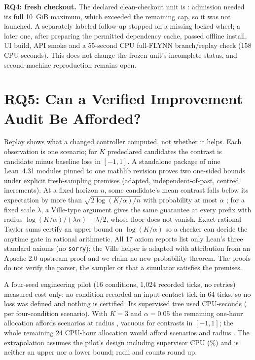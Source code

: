 \documentclass[letterpaper]{article}
\newcommand{\studyinput}[1]{}
\begin{document}
\begin{table}[t]
\centering\small
\caption{Operation costs on retained RQ2 source runs; each measures different work.}
\label{tab:operation}\resizebox{\columnwidth}{!}{\studyinput{operation-table}}
\end{table}

\textbf{RQ4: fresh checkout.} The declared clean-checkout unit is \OfflineStatus{}: admission needed its full 10~GiB
maximum, which exceeded the remaining cap, so it was not launched. A separately labeled follow-up stopped on a missing
locked wheel; a later one, after preparing the permitted dependency cache, passed offline install, UI build, API smoke
and a 55-second CPU full-FLYNN branch/replay check (158 CPU-seconds). This does not change the frozen unit's incomplete
status, and second-machine reproduction remains open.

\section{RQ5: Can a Verified Improvement Audit Be Afforded?}
Replay shows what a changed controller computed, not whether it helps. Each observation is one scenario; for $K$
predeclared candidates the contrast is candidate minus baseline loss in $[-1,1]$. A standalone package of nine Lean~4.31
modules pinned to one mathlib revision \citep{demoura2021lean4,mathlib2020} proves two one-sided bounds under explicit
fresh-sampling premises (adapted, independent-of-past, centred increments). At a fixed horizon $n$, some candidate's mean
contrast falls below its expectation by more than $\sqrt{2\log(K/\alpha)/n}$ with probability at most $\alpha$
\citep{hoeffding1963probability}; for a fixed scale $\lambda$, a Ville-type argument
\citep{ville1939etude,howard2021timeuniform} gives the same guarantee at every prefix with radius
$\log(K/\alpha)/(\lambda n)+\lambda/2$, whose floor does not vanish. Exact rational Taylor sums certify an upper bound on
$\log(K/\alpha)$ so a checker can decide the anytime gate in rational arithmetic. All 17 axiom reports list only Lean's
three standard axioms (no \texttt{sorry}); the Ville helper is adapted with attribution from an Apache-2.0 upstream proof \citep{aapbrepo}
and we claim no new probability theorem. The proofs do not verify the parser, the sampler or that a simulator satisfies the
premises.

A four-seed engineering pilot (16 conditions, 1,024 recorded ticks, no retries) measured cost only: no condition recorded
an input-contact tick in 64 ticks, so no loss was defined and nothing is certified. Its supervised tree used \AuditPilotCpu{}
CPU-seconds (\AuditPerScenarioCpu{} per four-condition scenario). With $K=3$ and $\alpha=0.05$ the remaining one-hour
allocation affords \AuditLaneScenarios{} scenarios at radius \AuditLaneRadius{}, vacuous for contrasts in $[-1,1]$; the
whole remaining 24 CPU-hour allocation would afford \AuditTotalScenarios{} scenarios and radius \AuditTotalRadius{}. The
extrapolation assumes the pilot's design including supervisor CPU (\AuditSupervisorShare{}\%) and is neither an upper nor a
lower bound; radii and counts round up.
\end{document}
